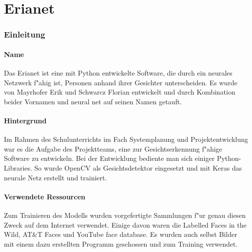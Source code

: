 \documentclass[12pt]{article}
\begin{document}
\tableofcontents
\newpage

\part{Erianet}
\section{Einleitung}
\subsection{Name}
Das Erianet ist eine mit Python entwickelte Software, die
durch ein neurales Netzwerk f"ahig ist,
Personen anhand ihrer Gesichter unterscheiden.
Es wurde von Mayrhofer Erik und Schwarcz Florian
entwickelt und durch Kombination beider Vornamen und {\glqq}neural net{\grqq}
auf seinen Namen getauft.
\subsection{Hintergrund}
Im Rahmen des Schulunterrichts im Fach {\glqq}Systemplanung und Projektentwicklung{\grqq}
war es die Aufgabe des Projektteams, eine zur Gesichtserkennung
f"ahige Software zu entwickeln.
Bei der Entwicklung bediente man sich einiger Python-Libraries.
So wurde OpenCV als Gesichtsdetektor eingesetzt und mit Keras das neurale
Netz erstellt und trainiert.
\subsection{Verwendete Ressourcen}
Zum Trainieren des Modells wurden vorgefertigte Sammlungen f"ur genau diesen
Zweck auf dem Internet verwendet. Einige davon waren die {\glqq}Labelled Faces in the Wild{\grqq},
{\glqq}AT\&T Faces{\grqq} und {\glqq}YouTube face database{\grqq}. Es wurden
auch selbst Bilder mit einem dazu erstellten Programm geschossen und zum Training verwendet.
\newpage
\end{document}
